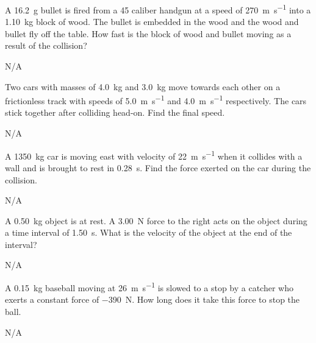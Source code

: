 \begin{question}[ID=impulse-B-Q05,topic=impulse,difficulty=B]
    A \SI{16.2}{\gram} bullet is fired from a \num{45} caliber
        handgun at a speed of \SI{270}{\meter\per\second} into
        a \SI{1.10}{\kilo\gram} block of wood.
    The bullet is embedded in the wood and the wood and bullet
        fly off the table.
    How fast is the block of wood and bullet moving as a result
        of the collision?
\end{question}
\begin{solution}
    N/A
\end{solution}


\begin{question}[ID=impulse-B-Q06,topic=impulse,difficulty=B]
    Two cars with masses of \SI{4.0}{\kilo\gram} and
        \SI{3.0}{\kilo\gram} move towards each other on
        a frictionless track with speeds of
        \SI{5.0}{\meter\per\second} and
        \SI{4.0}{\meter\per\second} respectively.
    The cars stick together after colliding head-on.
    Find the final speed.
\end{question}
\begin{solution}
    N/A
\end{solution}


\begin{question}[ID=impulse-C-Q01,topic=impulse,difficulty=C]
    A \SI{1350}{\kilo\gram} car is moving east with velocity of
        \SI{22}{\meter\per\second} when it collides with a wall
        and is brought to rest in \SI{0.28}{\second}.
    Find the force exerted on the car during the collision.
\end{question}
\begin{solution}
    N/A
\end{solution}


\begin{question}[ID=impulse-C-Q02,topic=impulse,difficulty=C]
    A \SI{0.50}{\kilo\gram} object is at rest.
    A \SI{3.00}{\newton} force to the right acts on 
        the object during a time interval of \SI{1.50}{\second}.
    What is the velocity of the object at the end of the interval?
\end{question}
\begin{solution}
    N/A
\end{solution}


\begin{question}[ID=impulse-C-Q03,topic=impulse,difficulty=C]
    A \SI{0.15}{\kilo\gram} baseball moving at
        \SI{26}{\meter\per\second} is slowed to a stop
        by a catcher who exerts a constant force of
        \SI{-390}{\newton}.
    How long does it take this force to stop the ball.
\end{question}
\begin{solution}
    N/A
\end{solution}


